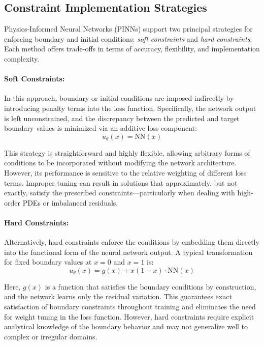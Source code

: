 \documentclass[twocolumn]{svjour3}
\begin{document}
	\subsection{Constraint Implementation Strategies}
	
	Physics-Informed Neural Networks (PINNs) support two principal strategies for enforcing boundary and initial conditions: \textit{soft constraints} and \textit{hard constraints}. Each method offers trade-offs in terms of accuracy, flexibility, and implementation complexity.
	
	\paragraph{Soft Constraints:} 
	In this approach, boundary or initial conditions are imposed indirectly by introducing penalty terms into the loss function. Specifically, the network output is left unconstrained, and the discrepancy between the predicted and target boundary values is minimized via an additive loss component:
		\begin{equation}
	u_\theta(x) = \text{NN}(x)
			\label{eq:111}
	\end{equation}

	This strategy is straightforward and highly flexible, allowing arbitrary forms of conditions to be incorporated without modifying the network architecture. However, its performance is sensitive to the relative weighting of different loss terms. Improper tuning can result in solutions that approximately, but not exactly, satisfy the prescribed constraints—particularly when dealing with high-order PDEs or imbalanced residuals.
	
	\paragraph{Hard Constraints:} 
	Alternatively, hard constraints enforce the conditions by embedding them directly into the functional form of the neural network output. A typical transformation for fixed boundary values at $x=0$ and $x=1$ is:
		\begin{equation}
	u_\theta(x) = g(x) + x(1 - x)\cdot \text{NN}(x)
			\label{eq:112}
	\end{equation}

	Here, $g(x)$ is a function that satisfies the boundary conditions by construction, and the network learns only the residual variation. This guarantees exact satisfaction of boundary constraints throughout training and eliminates the need for weight tuning in the loss function. However, hard constraints require explicit analytical knowledge of the boundary behavior and may not generalize well to complex or irregular domains.
	
\end{document}
